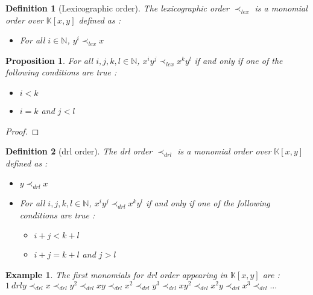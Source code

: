 \documentclass{article}
\newtheorem{definition}{Definition}[section]
\newtheorem{proposition}{Proposition}[section]
\newtheorem{example}{Example}[section]
\begin{document}
\begin{definition}[Lexicographic order]
    The lexicographic order $\prec_{lex}$ is a monomial order over $\mathbb{K}[x, y]$ defined as :
    \begin{itemize}
        \item For all $i \in \mathbb{N}$, $y^{i} \prec_{lex} x$
    \end{itemize}
\end{definition}

\begin{proposition}
    For all $i, j, k, l \in \mathbb{N}$, $x^{i}y^{j} \prec_{lex} x^{k}y^{l}$ if and only if one of the following conditions are true : 
    \begin{itemize}
        \item $i < k$
        \item $i = k$ and $j < l$
    \end{itemize}
\end{proposition}

\begin{proof}
    
\end{proof}

\begin{definition}[drl order]
    The drl order $\prec_{drl}$ is a monomial order over $\mathbb{K}[x, y]$ defined as : 
    \begin{itemize}
        \item $y \prec_{drl} x$
        \item For all $i, j, k, l \in \mathbb{N}$, $x^{i}y^{j} \prec_{drl} x^{k}y^{l}$ if and only if one of the following conditions are true : 
        \begin{itemize}
            \item $i + j < k + l$
            \item $i + j = k + l$ and $j > l$
        \end{itemize}
    \end{itemize}
\end{definition}

\begin{example}
    The first monomials for drl order appearing in $\mathbb{K}[x, y]$ are : \\
    $1 \
    {drl} y \prec_{drl} x \prec_{drl} y^{2} \prec_{drl} xy \prec_{drl} x^{2} \prec_{drl} y^{3} \prec_{drl} xy^{2} \prec_{drl} x^{2} y \prec_{drl} x^{3} \prec_{drl} ...$
\end{example}
\end{document}
